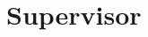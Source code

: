 \documentclass[12pt,a4paper]{article}
\title{\titlename}
\author{ \authorname\\ \scriptsize \authormail \\ \scriptsize \address }
\date{\exposedate}
\begin{document}
\maketitle





\nocite{*}
\printbibliography



\section*{Supervisor}

\supervisor
\end{document}
